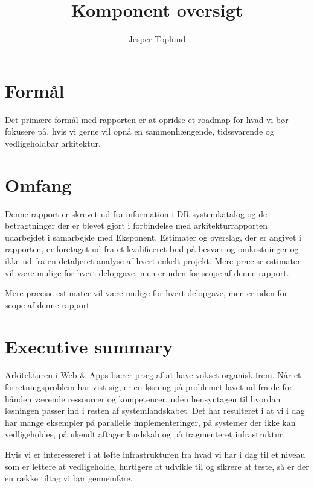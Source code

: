 \documentclass{article}
\author {Jesper Toplund}
\title{Komponent oversigt}
\date{}
\begin{document}
\maketitle

\tableofcontents

\newpage

\section{Formål}
Det primære formål med rapporten er at opridse et roadmap for hvad vi bør fokusere på, hvis vi gerne vil opnå en sammenhængende, tidssvarende og vedligeholdbar arkitektur.


\section{Omfang}
Denne rapport er skrevet ud fra information i DR-systemkatalog og de betragtninger der er blevet gjort i forbindelse med arkitekturrapporten udarbejdet i samarbejde med Eksponent. Estimater og overslag, der er angivet i rapporten, er foretaget ud fra et kvalificeret bud på besvær og omkostninger og ikke ud fra en detaljeret analyse af hvert enkelt projekt. Mere præcise estimater vil være mulige for hvert delopgave, men er uden for scope af denne rapport.
 
Mere præcise estimater vil være mulige for hvert delopgave, men er uden for scope af denne rapport.


\section{Executive summary}
Arkitekturen i Web \& Apps bærer præg af at have vokset organisk frem. Når et forretningsproblem har vist sig, er en løsning på problemet lavet ud fra de for hånden værende ressourcer og kompetencer, uden hensyntagen til hvordan løsningen passer ind i resten af systemlandskabet. Det har resulteret i at vi i dag har mange eksempler på parallelle implementeringer, på systemer der ikke kan vedligeholdes, på ukendt aftager landskab og på fragmenteret infrastruktur.

Hvis vi er interesseret i at løfte infrastrukturen fra hvad vi har i dag til et niveau som er lettere at vedligeholde, hurtigere at udvikle til og sikrere at teste, så er der en række tiltag vi bør gennemføre.
\end{document}
